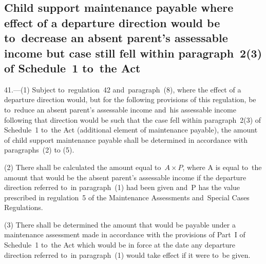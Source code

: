\documentclass[12pt,a4paper]{article}
\begin{document}
\renewcommand\parthead{--- Part~IX}

\subsection[41. Child support maintenance payable where effect of a departure direction
would be to~decrease an absent parent’s assessable income but case still fell
within paragraph~2(3) of Schedule~1 to~the Act]{Child support maintenance payable where effect of a departure direction
would be to~decrease an absent parent’s assessable income but case still fell
within paragraph~2(3) of Schedule~1 to~the Act}

41.—(1) Subject to~regulation~42
and~paragraph~(8), where the effect of a departure direction would, but for the
following provisions of this regulation, be to~reduce an absent parent’s
assessable income and~his assessable income following that direction would be
such that the case fell within paragraph~2(3) of Schedule~1 to~the Act
(additional element of maintenance payable), the amount of child support
maintenance payable shall be determined in accordance with paragraphs~(2) to
(5).

(2) There shall be calculated the amount equal to~\(A \times P\), where A is equal to~the
amount that would be the absent parent’s assessable income if the departure
direction referred to~in paragraph~(1) had been given and~P has the value
prescribed in regulation~5 of the Maintenance Assessments and~Special Cases
Regulations.


(3) There shall be determined the amount that would be payable under a maintenance assessment made in accordance with the provisions of Part~I of Schedule~1 to~the Act which would be in force at the date any departure direction referred to~in paragraph~(1) would take effect if it were to~be given.

\end{document}
